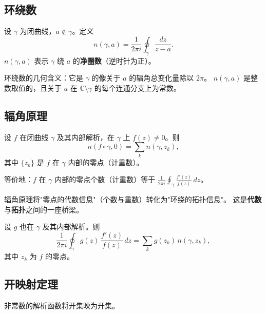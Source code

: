 
\subsection{环绕数}

\begin{definition}
设 $\gamma$ 为闭曲线，$a \notin \gamma$。定义
\[
  n(\gamma, a) = \frac{1}{2\pi i}\oint_\gamma \frac{dz}{z - a}.
\]
$n(\gamma, a)$ 表示 $\gamma$ 绕 $a$ 的\textbf{净圈数}（逆时针为正）。
\end{definition}

\begin{remark}
环绕数的几何含义：它是 $\gamma$ 的像关于 $a$ 的辐角总变化量除以 $2\pi$。
$n(\gamma, a)$ 是整数取值的，且关于 $a$ 在 $\mathbb{C}\setminus\gamma$ 的每个连通分支上为常数。
\end{remark}

\subsection{辐角原理}

\begin{theorem}
设 $f$ 在闭曲线 $\gamma$ 及其内部解析，在 $\gamma$ 上 $f(z) \neq 0$。则
\[
  n(f \circ \gamma, 0) = \sum_{k} n(\gamma, z_k),
\]
其中 $\{z_k\}$ 是 $f$ 在 $\gamma$ 内部的零点（计重数）。

等价地：$f$ 在 $\gamma$ 内部的零点个数（计重数）等于
$\displaystyle\frac{1}{2\pi i}\oint_\gamma \frac{f'(z)}{f(z)}\,dz$。
\end{theorem}

\begin{remark}
辐角原理将"零点的代数信息"（个数与重数）转化为"环绕的拓扑信息"。
这是\textbf{代数}与\textbf{拓扑}之间的一座桥梁。
\end{remark}

\begin{corollary}[加权辐角原理]
设 $g$ 也在 $\gamma$ 及其内部解析。则
\[
  \frac{1}{2\pi i}\oint_\gamma g(z)\,\frac{f'(z)}{f(z)}\,dz
  = \sum_{k} g(z_k)\,n(\gamma, z_k),
\]
其中 $z_k$ 为 $f$ 的零点。
\end{corollary}

\subsection{开映射定理}

\begin{theorem}
非常数的解析函数将开集映为开集。
\end{theorem}

